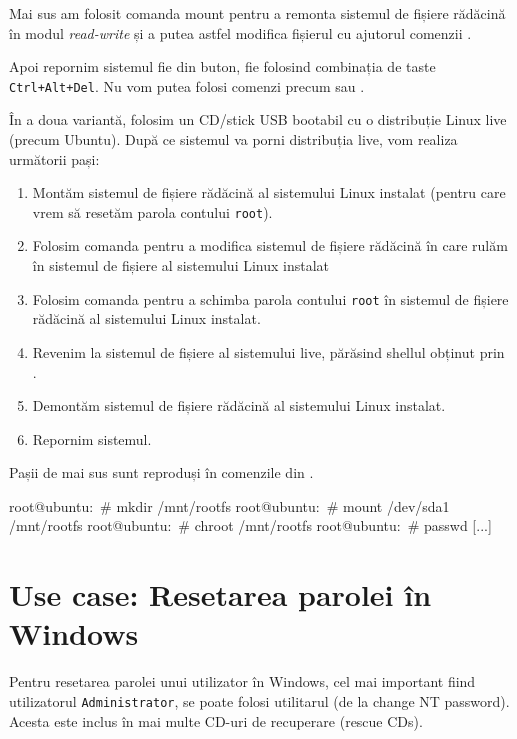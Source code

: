 Mai sus am folosit comanda mount pentru a remonta sistemul de fișiere rădăcină
în modul \textit{read-write} și a putea astfel modifica fișierul  cu ajutorul
comenzii .

Apoi repornim sistemul fie din buton, fie folosind combinația de taste
\texttt{Ctrl+Alt+Del}. Nu vom putea folosi comenzi precum  sau .

În a doua variantă, folosim un CD/stick USB bootabil cu o distribuție Linux live
(precum Ubuntu). După ce sistemul va porni distribuția live, vom realiza
următorii pași:

\begin{enumerate}
  \item Montăm sistemul de fișiere rădăcină al sistemului Linux instalat
    (pentru care vrem să resetăm parola contului \texttt{root}).
  \item Folosim comanda  pentru a modifica sistemul de fișiere
    rădăcină în care rulăm în sistemul de fișiere al sistemului
    Linux instalat
  \item Folosim comanda  pentru a schimba parola contului \texttt{root} în
    sistemul de fișiere rădăcină al sistemului Linux instalat.
  \item Revenim la sistemul de fișiere al sistemului live, părăsind
        shellul obținut prin .
  \item Demontăm sistemul de fișiere rădăcină al sistemului Linux
    instalat.
  \item Repornim sistemul.
\end{enumerate}

Pașii de mai sus sunt reproduși în comenzile din .

\begin{screen}[caption={Resetarea parolei contului root cu live CD},label={lst:user:pw-reset-live-cd}]
root@ubuntu:~# mkdir /mnt/rootfs
root@ubuntu:~# mount /dev/sda1 /mnt/rootfs
root@ubuntu:~# chroot /mnt/rootfs
root@ubuntu:~# passwd
[...]
\end{screen}

\section{Use case: Resetarea parolei în Windows}
\label{sec:user:windows-password-recovery}

Pentru resetarea parolei unui utilizator în Windows, cel mai important fiind
utilizatorul \texttt{Administrator}, se poate folosi utilitarul  (de la change NT
password). Acesta este inclus în mai multe CD-uri de recuperare (rescue CDs).


